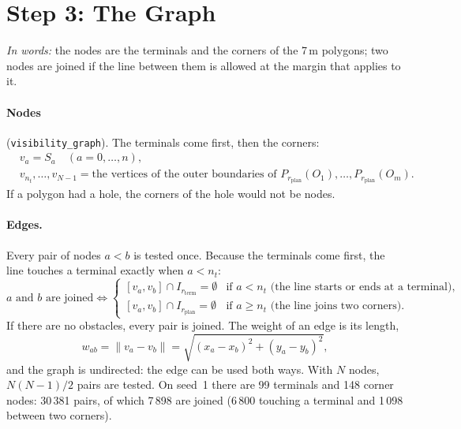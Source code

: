 \documentclass[10pt]{article}
\newcommand{\code}[1]{\texttt{#1}}
\newcommand{\rplan}{r_{\mathrm{plan}}}
\newcommand{\rterm}{r_{\mathrm{term}}}
\begin{document}
\section{Step 3: The Graph}

\emph{In words:} the nodes are the terminals and the corners of the 7\,m polygons; two nodes are joined if the line
between them is allowed at the margin that applies to it.

\paragraph{Nodes} (\code{visibility\_graph}). The terminals come first, then the corners:
\begin{equation}
  \begin{aligned}
  &v_a = S_a \quad (a = 0, \ldots, n),\\
  &v_{n_t}, \ldots, v_{N-1} = \text{the vertices of the outer boundaries of } P_{\rplan}(O_1), \ldots, P_{\rplan}(O_m).
  \end{aligned}
  \label{eq:nodes}
\end{equation}
If a polygon had a hole, the corners of the hole would not be nodes.

\paragraph{Edges.} Every pair of nodes $a < b$ is tested once. Because the terminals come first, the line touches a
terminal exactly when $a < n_t$:
\begin{equation}
  \boxed{\text{$a$ and $b$ are joined} \iff
  \begin{cases}
    [v_a, v_b] \cap I_{\rterm} = \emptyset & \text{if } a < n_t \text{ (the line starts or ends at a terminal)},\\
    [v_a, v_b] \cap I_{\rplan} = \emptyset & \text{if } a \ge n_t \text{ (the line joins two corners)}.
  \end{cases}}
  \label{eq:edges}
\end{equation}
If there are no obstacles, every pair is joined. The weight of an edge is its length,
\begin{equation}
  w_{ab} = \lVert v_a - v_b \rVert = \sqrt{(x_a - x_b)^2 + (y_a - y_b)^2},
  \label{eq:weight}
\end{equation}
and the graph is undirected: the edge can be used both ways. With $N$ nodes, $N(N - 1)/2$ pairs are tested. On seed~1
there are 99 terminals and 148 corner nodes: 30\,381 pairs, of which 7\,898 are joined (6\,800 touching a terminal and
1\,098 between two corners).
\end{document}
